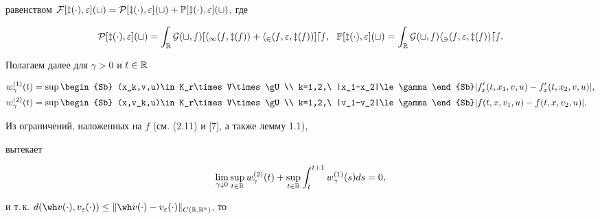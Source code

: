 равенством $\cal F[z(\cdot),\ve](t)= \cal P[z(\cdot),\ve](t)+


\Bbb P[z(\cdot),\ve](t)$, где


$$


\cal P[z(\cdot),\ve](t)= \int_{\R} \pG(t,s)


[h_1(s,z(s))+h_2(s,\ve,z(s))]ds, \ \


\Bbb P[z(\cdot),\ve](t)= \int_{\R} \pG(t,s) h_3(s,\ve,z(s))ds.


$$





Полагаем далее для $\gamma>0$ и $t\in\Bbb R$


\begin{align}


w_{\gamma}^{(1)}(t) &=


\sup\begin{Sb} (x_k,v,u)\in K_r\times V\times \gU \\


k=1,2,\ |x_1-x_2|\le\gamma\end{Sb}


|f_x'(t,x_1,v,u)-f_x'(t,x_2,v,u)|, \\


%


w_{\gamma}^{(2)}(t) &=


\sup\begin{Sb} (x,v_k,u)\in K_r\times V\times \gU \\


k=1,2,\ |v_1-v_2|\le\gamma\end{Sb}


|f(t,x,v_1,u)-f(t,x,v_2,u)|.


\end{align}


Из ограничений, наложенных на $f$ (см. (2.11) и [7], а также лемму 1.1),


вытекает


\begin{equation}


\lim_{\gamma\downarrow 0}


\sup_{t\in\R} w_{\gamma}^{(2)}(t)+


\sup_{t\in\R} \int_{t}^{t+1} w_{\gamma}^{(1)}(s)ds=0,


\end{equation}


и т.\,к. $d(\wh v(\cdot),v_{\ve}(\cdot))\le \|\wh


v(\cdot)-v_{\ve}(\cdot)\|_{C(\R,\R^k)}$, то



